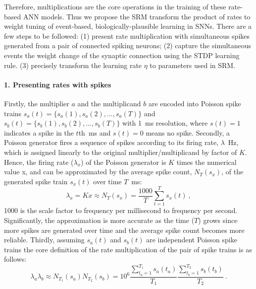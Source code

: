 Therefore, \DIFdelbegin {}\DIFdelend multiplications are the core operations in the training of these rate-based ANN models.
Thus we propose the SRM \DIFdelbegin {}\DIFdelend \DIFaddbegin {}\DIFaddend transform the product of rates to weight tuning of event-based, biologically-plausible learning in SNNs.
There are a few steps to be followed: (1) present \DIFaddbegin {}\DIFaddend rate multiplication with simultaneous spikes generated from a pair of connected spiking neurons;
(2) capture the simultaneous events \DIFdelbegin {}\DIFdelend \DIFaddbegin {}\DIFaddend the weight change of the synaptic connection using the STDP learning rule.
(3) precisely transform the learning rate $\eta$ to parameters used in SRM.

\paragraph{1. Presenting rates with spikes\\}
Firstly, the multiplier $a$ and the multiplicand $b$ are encoded into Poisson spike trains $s_a(t)=\{s_a(1),s_a(2),...,s_a(T)\}$ and $s_b(t)=\{s_b(1),s_b(2),...,s_b(T)\}$ with 1~ms resolution, where $s(t)=1$ indicates a spike in the $t$th~ms and $s(t)=0$ means no spike.
Secondly, a Poisson generator fires a sequence of spikes according to its firing rate, $\lambda$~Hz, which is assigned linearly to the original multiplier/multiplicand by \DIFdelbegin {}\DIFdelend \DIFaddbegin {}\DIFaddend factor of $K$.
Hence, the firing rate ($\lambda_x$) of the Poisson generator is $K$ times the numerical value x, and can be approximated by the average spike count, $N_T(s_x)$, of the generated spike train $s_x(t)$ over time $T$~ms:
\begin{equation}
\lambda_x = Kx \approx N_T(s_x) = \frac{1000}{T} \sum_{t=1}^{T} s_x(t)~,
\end{equation} 
1000 is the scale factor to \DIFdelbegin {}\DIFdelend \DIFaddbegin {}\DIFaddend frequency per millisecond to frequency per second.
Significantly, the approximation is more accurate as the \DIFdelbegin {}\DIFdelend \DIFaddbegin {}\DIFaddend time ($T$) grows since more spikes are generated over time and the average spike count becomes more reliable.
Thirdly, assuming $s_a(t)$ and $s_b(t)$ are independent Poisson spike trains the core definition of the rate multiplication of the pair of spike trains is as follows:
\begin{equation}
\lambda_a \lambda_b \approx N_{T_1}(s_a)N_{T_2}(s_b)= 10^6 \frac{\sum_{t_a=1}^{T_1}s_a(t_a)}{T_1}  \frac{\sum_{t_b=1}^{T_2} s_b(t_b)}{T_2}~.
\label{equ:mul}
\end{equation} 

